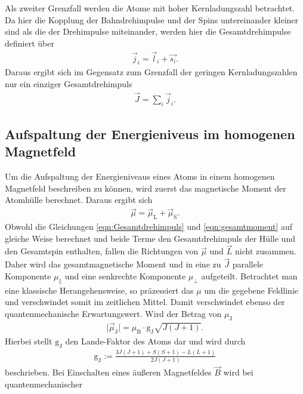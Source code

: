 Als zweiter Grenzfall werden die Atome mit hoher Kernladungszahl betrachtet.
Da hier die Kopplung der Bahndrehimpulse und der Spins untereinander kleiner sind
als die der Drehimpulse miteinander, werden hier die Gesamtdrehimpulse definiert
über
\begin{align}
  \vec{j}_i = \vec{l}_i + \vec{s_i}.
  \label{eqn:gesamt}
\end{align}
Daraus ergibt sich im Gegensatz zum Grenzfall der geringen Kernladungszahlen nur
ein einziger Gesamtdrehimpuls
\begin{align}
  \vec{J} = \sum_i \vec{j}_i.
  \label{eqn:Gesamtdrehimpuls}
\end{align}

\subsection{Aufspaltung der Energieniveus im homogenen Magnetfeld}
\label{sec:aufspaltung}
Um die Aufspaltung der Energieniveaus eines Atoms in einem homogenen Magnetfeld
beschreiben zu können, wird zuerst das magnetische Moment der Atomhülle berechnet.
Daraus ergibt sich
\begin{align}
  \vec{\mu} = \vec{\mu}_\text{L} + \vec{\mu}_\text{S}.
  \label{eqn:gesamtmoment}
\end{align}
Obwohl die Gleichungen \ref{eqn:Gesamtdrehimpuls} und \ref{eqn:gesamtmoment}
auf gleiche Weise berechnet und beide Terme den Gesamtdrehimpuls der Hülle und
den Gesamtspin enthalten, fallen die Richtungen von $\vec{\mu}$ und $\vec{L}$
nicht zusammen. Daher wird das gesamtmagnetische Moment und in eine zu $\vec{J}$
parallele Komponente $\mu_{\parallel}$ und eine senkrechte Komponente $\mu_{\bot}$
aufgeteilt. Betrachtet man eine klassische Herangehensweise, so präzessiert das
$\mu$ um die gegebene Feldlinie und verschwindet somit im zeitlichen Mittel. Damit
verschwindet ebenso der quantenmechanische Erwartungswert. Wird der Betrag von
$\mu_\text{J}$
\begin{align}
  \mid \vec{\mu}_\text{J} \mid = \mu_\text{B}\cdot \text{g}_\text{J} \sqrt{J\left(J+1 \right)}.
\end{align}
Hierbei stellt $\text{g}_\text{J}$ den Lande-Faktor des Atoms dar und wird durch
\begin{align}
  \text{g}_\text{J} := \frac{3J\left(J+1 \right) + S\left(S+1 \right) - L\left(L+1 \right)}{2J\left(J+1 \right)}
\end{align}
beschrieben.
Bei Einschalten eines äußeren Magnetfeldes $\vec{B}$ wird bei quantenmechanischer
